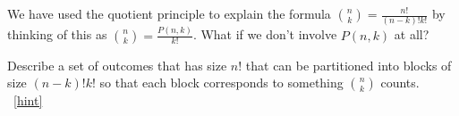 \documentclass{book}
\begin{document}
\setcounter{project}{114}
\addtocounter{project}{-1}
\begin{activity}[]\label{activity-107}
\hypertarget{p-823}{}%
We have used the quotient principle to explain the formula \(\binom{n}{k} = \frac{n!}{(n-k)!k!}\) by thinking of this as \(\binom{n}{k} = \frac{P(n,k)}{k!}\).  What if we don't involve \(P(n,k)\) at all?%
\par
\hypertarget{p-824}{}%
Describe a set of outcomes that has size \(n!\) that can be partitioned into blocks of size \((n-k)!k!\) so that each block corresponds to something \(\binom{n}{k}\) counts.%
~\hfill{\tiny\hyperlink{a-114}{[hint]}\hypertarget{q-114}{}}\end{activity}
\end{document}
